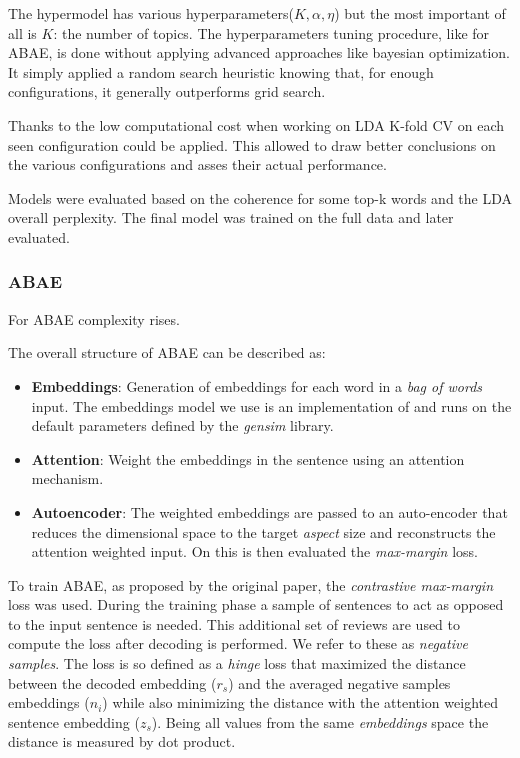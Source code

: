 The hypermodel has various hyperparameters($K,\alpha, \eta$) but the most important of all is $K$: the number of topics.
The hyperparameters tuning procedure, like for ABAE, is done without applying advanced approaches like bayesian optimization.
It simply applied a random search heuristic knowing that, for enough configurations, it generally outperforms grid search. %

Thanks to the low computational cost when working on LDA K-fold CV on each seen configuration could be applied.
This allowed to draw better conclusions on the various configurations and asses their actual performance.

Models were evaluated based on the coherence for some top-k words and the LDA overall perplexity.
The final model was trained on the full data and later evaluated.

\subsubsection{ABAE}
For ABAE complexity rises.

The overall structure of ABAE can be described as:
\begin{itemize}
    \item {\textbf{Embeddings}}: Generation of embeddings for each word in a \textit{bag of words} input.
    The embeddings model we use is an implementation of  and runs on the default parameters defined by the \textit{gensim} library.
    \item {\textbf{Attention}}: Weight the embeddings in the sentence using an attention mechanism.
    \item {\textbf{Autoencoder}}: The weighted embeddings are passed to an auto-encoder that reduces the dimensional
    space to the target \textit{aspect} size and reconstructs the attention weighted input.
    On this is then evaluated the \textit{max-margin} loss.
\end{itemize}

To train ABAE, as proposed by the original paper, the \textit{contrastive max-margin} loss was used.
During the training phase a sample of sentences to act as opposed to the input sentence is needed.
This additional set of reviews are used to compute the loss after decoding is performed.
We refer to these as \textit{negative samples}.
The loss is so defined as a \textit{hinge} loss that maximized the distance between the decoded embedding ($r_s$)
and the averaged negative samples embeddings ($n_i$) while also minimizing the distance with the attention weighted sentence embedding ($z_s$).
Being all values from the same \textit{embeddings} space the distance is measured by dot product.

